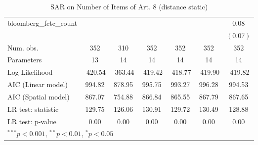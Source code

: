\begin{table}[!h]
\begin{center}
\begin{tabular}{l c c c c c c }
bloomberg\_fctc\_count  &              &              &              &              &              & $0.08$       \\
                        &              &              &              &              &              & $(0.07)$     \\
\midrule
Num. obs.               & 352          & 310          & 352          & 352          & 352          & 352          \\
Parameters              & 13           & 14           & 14           & 14           & 14           & 14           \\
Log Likelihood          & -420.54      & -363.44      & -419.42      & -418.77      & -419.90      & -419.82      \\
AIC (Linear model)      & 994.82       & 878.95       & 995.75       & 993.27       & 996.28       & 994.53       \\
AIC (Spatial model)     & 867.07       & 754.88       & 866.84       & 865.55       & 867.79       & 867.65       \\
LR test: statistic      & 129.75       & 126.06       & 130.91       & 129.72       & 130.49       & 128.88       \\
LR test: p-value        & 0.00         & 0.00         & 0.00         & 0.00         & 0.00         & 0.00         \\
\bottomrule
\multicolumn{7}{l}{\scriptsize{$^{***}p<0.001$, $^{**}p<0.01$, $^*p<0.05$}}
\end{tabular}
\caption{SAR on Number of Items of Art. 8 (distance static)}
\label{table:coefficients}
\end{center}
\end{table}
